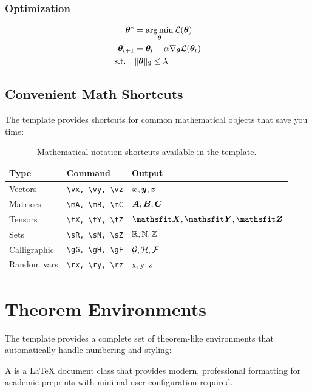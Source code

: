\documentclass{triton}
\begin{document}
\subsubsection{Optimization}
\begin{align}
{\bm{\theta}}^* &= \operatorname*{arg\,min}_{{\bm{\theta}}} \mathcal{L}({\bm{\theta}}) \\
{\bm{\theta}}_{t+1} &= {\bm{\theta}}_t - \alpha \nabla_{{\bm{\theta}}} \mathcal{L}({\bm{\theta}}_t) \\
\text{s.t.} \quad &\|{\bm{\theta}}\|_2 \leq \lambda
\end{align}

\subsection{Convenient Math Shortcuts}

The template provides shortcuts for common mathematical objects that save you time:

\begin{table}[h]
\centering
\begin{tabular}{@{}lll@{}}
\toprule
\textbf{Type} & \textbf{Command} & \textbf{Output} \\
\midrule
Vectors & \verb|\vx, \vy, \vz| & ${\bm{x}}, {\bm{y}}, {\bm{z}}$ \\
Matrices & \verb|\mA, \mB, \mC| & ${\bm{A}}, {\bm{B}}, {\bm{C}}$ \\
Tensors & \verb|\tX, \tY, \tZ| & $\tX, \tY, \tZ$ \\
Sets & \verb|\sR, \sN, \sZ| & ${\mathbb{R}}, {\mathbb{N}}, {\mathbb{Z}}$ \\
Calligraphic & \verb|\gG, \gH, \gF| & ${\mathcal{G}}, {\mathcal{H}}, {\mathcal{F}}$ \\
Random vars & \verb|\rx, \ry, \rz| & ${\textnormal{x}}, {\textnormal{y}}, {\textnormal{z}}$ \\
\bottomrule
\end{tabular}
\caption{Mathematical notation shortcuts available in the template.}
\end{table}

\section{Theorem Environments}

The template provides a complete set of theorem-like environments that automatically handle numbering and styling:

\begin{definition}
A  is a \LaTeX{} document class that provides modern, professional formatting for academic preprints with minimal user configuration required.
\end{definition}
\end{document}
